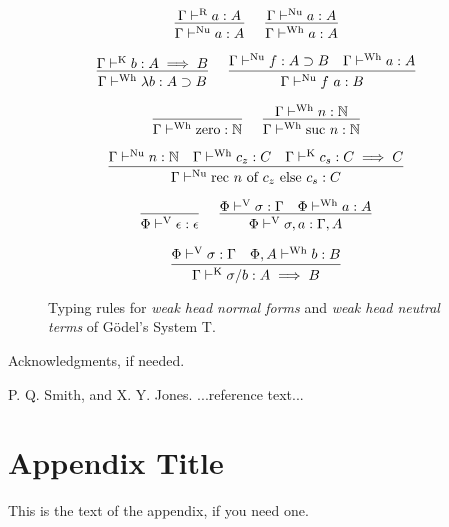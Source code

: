 \documentclass[preprint,authoryear]{sigplanconf}
\def\turnstyle{\vdash}
\def\asc{:}
\def\arr{\supset}
\def\nat{\mathbb{N}}
\def\emp{\epsilon}
\def\zero{\con{zero}}
\newcommand{\suc}[1]{\con{suc}~#1}
\newcommand{\rec}[3]{\con{rec}~#1~\con{of}~#2~\con{else}~#3}
\newcommand{\con}[1]{\textmd{#1}}
\newcommand{\turn}[1]{\turnstyle^\con{#1}}
\newcommand{\typr}[2]{\Gamma \turn{R}  #1 \asc #2}
\newcommand{\typk}[3]{\Gamma \turn{K}  #1 \asc #2 \implies #3}
\newcommand{\typv}[2]{\Phi \turn{V}  #1 \asc #2}
\newcommand{\typwh}[2]{\ctypwh{\Gamma}{#1}{#2}}
\newcommand{\ctypwh}[3]{#1 \turn{Wh}  #2 \asc #3}
\newcommand{\typnu}[2]{\Gamma \turn{Nu}  #1 \asc #2}
\begin{document}
\begin{figure}[t!]
\caption{
Typing rules for \textit{weak head normal forms} and
\textit{weak head neutral terms} of G{\"o}del's System T.
}

$$
\infer
  []
  {\typnu{a}{A}}
{
  \typr{a}{A}
}
\quad
\infer
  []
  {\typwh{a}{A}}
{
  \typnu{a}{A}
}
$$

$$
\infer
  []
  {\typwh{\lambda b}{A \arr B}}
{
  \typk{b}{A}{B}
}
\quad
\infer
  []
  {\typnu{f~a}{B}}
{
  \typnu{f}{A \arr B}
  &
  \typwh{a}{A}
}
$$

$$
\infer
  []
  {\typwh{\zero}{\nat}}
{
}
\quad
\infer
  []
  {\typwh{\suc{n}}{\nat}}
{
  \typwh{n}{\nat}
}
$$

$$
\infer
  []
  {\typnu{\rec{n}{c_z}{c_s}}{C}}
{
  \typnu{n}{\nat}
  &
  \typwh{c_z}{C}
  &
  \typk{c_s}{C}{C}
}
$$

$$
\infer
  []
  {\typv{\emp}{\emp}}
{
}
\quad
\infer
  []
  {\typv{\sigma, a}{\Gamma, A}}
{
  \typv{\sigma}{\Gamma}
  &
  \ctypwh{\Phi}{a}{A}
}
$$

$$
\infer
  []
  {\typk{\sigma / b}{A}{B}}
{
  \typv{\sigma}{\Gamma}
  &
  \ctypwh{\Phi, A}{b}{B}
}
$$

\label{fig:type:wh}
\end{figure}

\acks

Acknowledgments, if needed.





\begin{thebibliography}{}
\softraggedright

P. Q. Smith, and X. Y. Jones. ...reference text...

\end{thebibliography}

\appendix
\section{Appendix Title}

This is the text of the appendix, if you need one.
\end{document}
